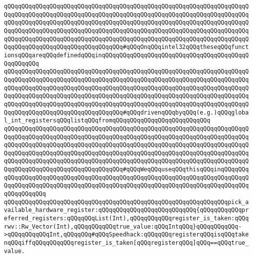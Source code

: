 \verb|qQQqqQQqqQQqqQQqqQQqqQQqqQQqqQQqqQQqqQQqqQQqqQQqqQQqqQQqqQQqqQQqqQQqqQQqqQQqqQQqqQQqqQQqqQQqqQQqqQQqqQQqqQQqqQQqqQQqqQQqqQQqqQQqqQQqqQQqqQQqqQQqqQQqqQQqqQQqqQQqqQQqqQQqqQQqqQQqqQQqqQQqqQQqqQQqqQQqqQQqqQQqqQQqqQQqqQQqqQQqqQQqqQQqqQQqqQQqqQQqqQQqqQQqqQQqqQQqqQQqqQQqqQQqqQQqqQQqqQQqqQQqqQQqqQQqqQQqqQQqqQQqqQQqqQQqqQQqqQQqqQQqqQQqqQQqqQQqqQQqqQQqqQQqqQQqqQQqqQQqqQQqqQQqqQQqqQQqqQQqqQQq#qQQqOnqQQqintel32qQQqtheseqQQqfunctionsqQQqareqQQqdefinedqQQqinqQQqqQQqqQQqqQQqqQQqqQQqqQQqqQQqqQQqqQQqqQQqqQQqqQQq|\newline
\verb|qQQqqQQqqQQqqQQqqQQqqQQqqQQqqQQqqQQqqQQqqQQqqQQqqQQqqQQqqQQqqQQqqQQqqQQqqQQqqQQqqQQqqQQqqQQqqQQqqQQqqQQqqQQqqQQqqQQqqQQqqQQqqQQqqQQqqQQqqQQqqQQqqQQqqQQqqQQqqQQqqQQqqQQqqQQqqQQqqQQqqQQqqQQqqQQqqQQqqQQqqQQqqQQqqQQqqQQqqQQqqQQqqQQqqQQqqQQqqQQqqQQqqQQqqQQqqQQqqQQqqQQqqQQqqQQqqQQqqQQqqQQqqQQqqQQqqQQqqQQqqQQqqQQqqQQqqQQqqQQqqQQqqQQqqQQqqQQqqQQqqQQqqQQqqQQqqQQqqQQqqQQqqQQqqQQqqQQqqQQqqQQq#qQQqdrivenqQQqbyqQQq(e.g.)qQQqglobal_int_registersqQQqlistqQQqfromqQQqqQQqqQQqqQQqqQQqqQQqqQQq|\newline
\verb|qQQqqQQqqQQqqQQqqQQqqQQqqQQqqQQqqQQqqQQqqQQqqQQqqQQqqQQqqQQqqQQqqQQqqQQqqQQqqQQqqQQqqQQqqQQqqQQqqQQqqQQqqQQqqQQqqQQqqQQqqQQqqQQqqQQqqQQqqQQqqQQqqQQqqQQqqQQqqQQqqQQqqQQqqQQqqQQqqQQqqQQqqQQqqQQqqQQqqQQqqQQqqQQqqQQqqQQqqQQqqQQqqQQqqQQqqQQqqQQqqQQqqQQqqQQqqQQqqQQqqQQqqQQqqQQqqQQqqQQqqQQqqQQqqQQqqQQqqQQqqQQqqQQqqQQqqQQqqQQqqQQqqQQqqQQqqQQqqQQqqQQqqQQqqQQqqQQqqQQqqQQqqQQqqQQqqQQqqQQqqQQq#qQQqWeqQQquseqQQqthisqQQqinqQQqqQQqqQQqqQQqqQQqqQQqqQQqqQQqqQQqqQQqqQQqqQQqqQQqqQQqqQQqqQQqqQQqqQQqqQQqqQQqqQQqqQQqqQQqqQQqqQQqqQQqqQQqqQQqqQQqqQQqqQQqqQQqqQQqqQQqqQQqqQQqqQQqqQQqqQQqqQQq|\newline
\newline
\verb|qQQqqQQqqQQqqQQqqQQqqQQqqQQqqQQqqQQqqQQqqQQqqQQqqQQqqQQqqQQqqQQqpick_available_hardware_register:qQQqqQQqqQQqqQQqqQQqqQQqqQQq{qQQqqQQqqQQqpreferred_registers:qQQqqQQqList(Int),qQQqqQQqqQQqregister_is_taken:qQQqrwv::Rw_Vector(Int),qQQqqQQqqQQqtrue_value:qQQqIntqQQq}qQQqqQQqqQQq->qQQqqQQqqQQqInt,qQQqqQQq#qQQqSpeedhack:qQQqqQQqregisterqQQqisqQQqtakenqQQqiffqQQqqQQqqQQqregister_is_taken[qQQqregisterqQQq]qQQq==qQQqtrue_value.|\newline
